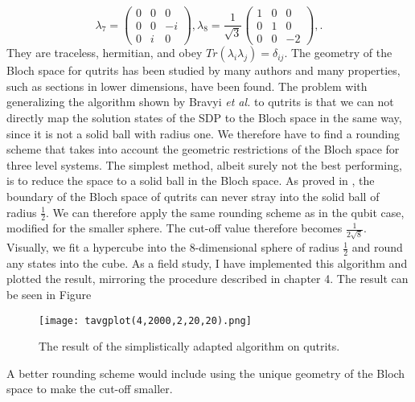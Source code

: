 \[
\lambda_7=\begin{pmatrix} 0 & 0 & 0 \\ 0 & 0 & -i \\ 0 & i & 0 \end{pmatrix},
\lambda_8=\frac{1}{\sqrt{3}} \begin{pmatrix} 1 & 0 & 0 \\ 0 & 1 & 0 \\ 0 & 0 & -2 \end{pmatrix},
.\]
They are traceless, hermitian, and obey $Tr\left(\lambda_i\lambda_j\right)=\delta_{ij}$.
The geometry of the Bloch space for qutrits has been studied by many authors \cite{mendas06,goyal16,kimura03} and many properties, such as sections in lower dimensions, have been found.
The problem with generalizing the algorithm shown by Bravyi \emph{et al.} to qutrits is that we can not directly map the solution states of the SDP to the Bloch space in the same way, since it is not a solid ball with radius one.
We therefore have to find a rounding scheme that takes into account the geometric restrictions of the Bloch space for three level systems.
The simplest method, albeit surely not the best performing, is to reduce the space to a solid ball in the Bloch space.
As proved in \cite{goyal16}, the boundary of the Bloch space of qutrits can never stray into the solid ball of radius $\frac{1}{2}$. 
We can therefore apply the same rounding scheme as in the qubit case, modified for the smaller sphere.
The cut-off value therefore becomes $\frac{1}{2\sqrt{8}}$.
Visually, we fit a hypercube into the $8$-dimensional sphere of radius $\frac{1}{2}$ and round any states into the cube.
As a field study, I have implemented this algorithm and plotted the result, mirroring the procedure described in chapter 4.
The result can be seen in Figure 
\begin{figure}[H]
	\centering
	\texttt{[image: tavgplot(4,2000,2,20,20).png]}
	\caption{The result of the simplistically adapted algorithm on qutrits.}
	\label{fig:4}
\end{figure}
\noindent A better rounding scheme would include using the unique geometry of the Bloch space to make the cut-off smaller.
